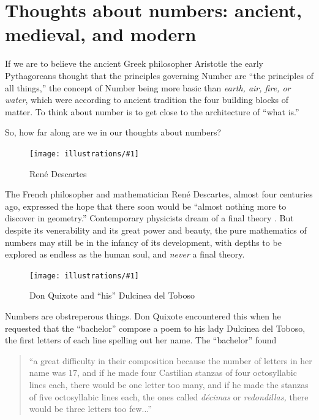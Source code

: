 \documentclass[openany]{book}
\newcommand{\ill}[3]{%
   \begin{figure}[H]%
   \vspace{-2ex}
   \centering%
   \texttt{[image: illustrations/\#1]}%
   \caption{#3}%
   \vspace{-2ex}
    \end{figure}}
\theoremstyle{plain}
\theoremstyle{definition}
\begin{document}
\chapter[Thoughts about numbers]{Thoughts about numbers: ancient, medieval, and modern}

If we are to believe the ancient Greek philosopher Aristotle the early
Pythagoreans thought that the principles governing Number are ``the
principles of all things,'' the concept of Number being more basic than
{\em earth, air, fire, or water}, which were according to ancient tradition
the four building blocks of matter. To think about number is to get
close to the architecture of ``what is.''

So, how far along are we in our thoughts about numbers?


\ill{descartes}{.25}{Ren\'e Descartes}

The French philosopher and mathematician Ren\'e Descartes, almost four
centuries ago, expressed the hope that there soon would be ``almost
nothing more to discover in geometry.'' Contemporary physicists dream
of a final theory .  But despite its
venerability and its great power and beauty, the pure mathematics of
numbers may still be in the infancy of its development, with depths to
be explored as endless as the human soul, and {\it never} a final theory.





\ill{dulcinea1}{.2}{Don Quixote and ``his'' Dulcinea del Toboso}

Numbers are obstreperous things. Don Quixote encountered this when he
requested that the ``bachelor'' compose a poem to his lady Dulcinea del
Toboso, the first letters of each line spelling out her name. The
``bachelor'' found




\begin{quote}
  ``a great difficulty in their composition because the number of
  letters in her name was $17$, and if he made four Castilian stanzas
  of four octosyllabic lines each, there would be one letter too many,
  and if he made the stanzas of five octosyllabic lines each, the ones
  called {\em d{\'e}cimas} or {\em redondillas,} there would be three
  letters too few...'' 
\end{quote}
\end{document}
